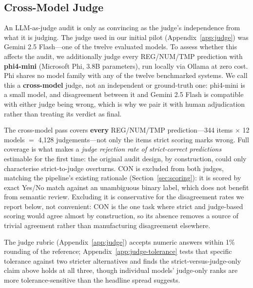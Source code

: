 
\subsection{Cross-Model Judge}
\label{sec:judge}

An LLM-as-judge audit is only as convincing as the judge's independence from what it is judging.
The judge used in our initial pilot (Appendix~\ref{app:judge}) was Gemini 2.5 Flash---one of the
twelve evaluated models. To assess whether this affects the audit, we additionally judge every REG/NUM/TMP
prediction with \textbf{phi4-mini} (Microsoft Phi, 3.8B parameters), run locally via Ollama at zero
cost. Phi shares no model family with any of the twelve benchmarked systems. We call this a
\textbf{cross-model} judge, not an independent or ground-truth one: phi4-mini is a small model, and
disagreement between it and Gemini 2.5 Flash is compatible with either judge being wrong, which is
why we pair it with human adjudication rather than treating its verdict as final.

The cross-model pass covers \textbf{every} REG/NUM/TMP prediction---344 items $\times$ 12 models
$=$ 4{,}128 judgements---not only the items strict scoring marks wrong. Full coverage is what makes
a \emph{judge rejection rate of strict-correct predictions} estimable for the first time: the
original audit design, by construction, could only characterise strict-to-judge overturns. CON is excluded from both judges, matching
the pipeline's existing rationale (Section~\ref{sec:scoring}): it is scored by exact Yes/No match
against an unambiguous binary label, which does not benefit from semantic review. Excluding it is
conservative for the disagreement rates we report below, not convenient: CON is the one task where
strict and judge-based scoring would agree almost by construction, so its absence removes a source
of trivial agreement rather than manufacturing disagreement elsewhere.

The judge rubric (Appendix~\ref{app:judge}) accepts numeric answers within 1\% rounding of the
reference; Appendix~\ref{app:judge-tolerance} tests that specific tolerance against two stricter
alternatives and finds the strict-versus-judge-only claim above holds at all three, though
individual models' judge-only ranks are more tolerance-sensitive than the headline spread suggests.

